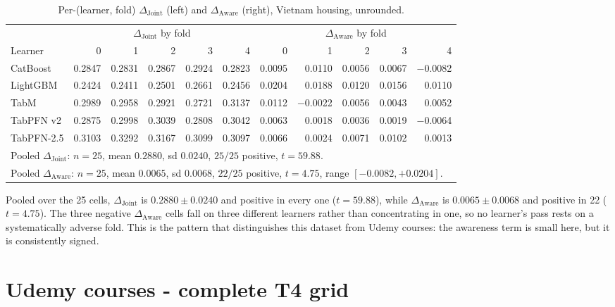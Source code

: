 \documentclass{article}
\newcommand{\djoint}{\Delta_{\text{Joint}}}
\newcommand{\daware}{\Delta_{\text{Aware}}}
\begin{document}
\begin{table}[H]
\centering\small
\caption{Per-(learner, fold) $\djoint$ (left) and $\daware$ (right), Vietnam housing, unrounded.}
\begin{tabular}{lrrrrr@{\hskip 18pt}rrrrr}
\toprule
& \multicolumn{5}{c}{$\djoint$ by fold} & \multicolumn{5}{c}{$\daware$ by fold} \\
\cmidrule(r){2-6}\cmidrule(l){7-11}
Learner & 0 & 1 & 2 & 3 & 4 & 0 & 1 & 2 & 3 & 4 \\
\midrule
CatBoost   & 0.2847 & 0.2831 & 0.2867 & 0.2924 & 0.2823 & \phantom{-}0.0095 & \phantom{-}0.0110 & 0.0056 & 0.0067 & $-$0.0082 \\
LightGBM   & 0.2424 & 0.2411 & 0.2501 & 0.2661 & 0.2456 & 0.0204 & 0.0188 & 0.0120 & 0.0156 & 0.0110 \\
TabM       & 0.2989 & 0.2958 & 0.2921 & 0.2721 & 0.3137 & 0.0112 & $-$0.0022 & 0.0056 & 0.0043 & 0.0052 \\
TabPFN v2  & 0.2875 & 0.2998 & 0.3039 & 0.2808 & 0.3042 & 0.0063 & 0.0018 & 0.0036 & 0.0019 & $-$0.0064 \\
TabPFN-2.5 & 0.3103 & 0.3292 & 0.3167 & 0.3099 & 0.3097 & 0.0066 & 0.0024 & 0.0071 & 0.0102 & 0.0013 \\
\midrule
\multicolumn{11}{l}{Pooled $\djoint$: $n{=}25$, mean $0.2880$, sd $0.0240$, $25/25$ positive, $t = 59.88$.} \\
\multicolumn{11}{l}{Pooled $\daware$: $n{=}25$, mean $0.0065$, sd $0.0068$, $22/25$ positive, $t = 4.75$, range $[-0.0082, +0.0204]$.} \\
\bottomrule
\end{tabular}
\end{table}

\noindent Pooled over the 25 cells, $\djoint$ is $0.2880 \pm 0.0240$ and positive in every one
($t = 59.88$), while $\daware$ is $0.0065 \pm 0.0068$ and positive in 22 ($t = 4.75$). The three
negative $\daware$ cells fall on three different learners rather than concentrating in one, so no
learner's pass rests on a systematically adverse fold. This is the pattern that distinguishes
this dataset from Udemy courses: the awareness term is small here, but it is consistently
signed.


\clearpage
\section{Udemy courses - complete T4 grid}
\label{app:udemy}
\end{document}
